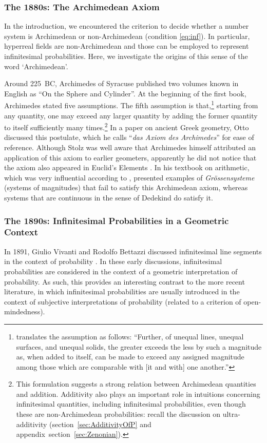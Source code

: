 \subsubsection*{The 1880s: The Archimedean Axiom}
In the introduction, we encountered the criterion to decide whether a number system is Archimedean or non-Archimedean (condition \ref{eq:inf}).
In particular, hyperreal fields are non-Archimedean and those can be employed to represent infinitesimal probabilities.
Here, we investigate the origins of this sense of the word `Archimedean'.

Around 225~BC, Archimedes of Syracuse published two volumes known in English as ``On the Sphere and Cylinder''. At the beginning of the first book, Archimedes stated five assumptions. The fifth assumption is that,\footnote{\citet[p.~4]{Heath:1897} translates the assumption as follows: ``Further, of unequal lines, unequal surfaces, and unequal solids, the greater exceeds the less by such a magnitude as, when added to itself, can be made to exceed any assigned magnitude among those which are comparable with [it and with] one another.''} starting from any quantity, one may exceed any larger quantity by adding the former quantity to itself sufficiently many times.\footnote{This formulation suggests a strong relation between Archimedean quantities and addition. Additivity also plays an important role in intuitions concerning infinitesimal quantities, including infinitesimal probabilities, even though these are non-Archimedean probabilities: recall the discussion on ultra-additivity (section~\ref{sec:AdditivityOfP} and appendix~section~\ref{sec:Zenonian}).}
In a paper on ancient Greek geometry, Otto \citet{Stolz:1883} discussed this postulate, which he calls ``\textit{das Axiom des Archimedes}'' for ease of reference. Although Stolz was well aware that Archimedes himself attributed an application of this axiom to earlier geometers, apparently he did not notice that the axiom also appeared in Euclid's Elements \citep[p.~888]{Bair-etal:2013}.
In his textbook on arithmetic, which was very influential according to \citet[p.~5]{Ehrlich:2006}, \citet{Stolz:1885} presented examples of \textit{Gr{\"o}ssensysteme} (systems of magnitudes) that fail to satisfy this Archimedean axiom, whereas systems that are continuous in the sense of Dedekind do satisfy it.

\subsubsection*{The 1890s: Infinitesimal Probabilities in a Geometric Context}
In 1891, Giulio Vivanti and Rodolfo Bettazzi discussed infinitesimal line segments in the context of probability \citep[see][]{Ehrlich:2006}.
In these early discussions, infinitesimal probabilities are considered in the context of a geometric interpretation of probability. As such, this provides an interesting contrast to the more recent literature, in which infinitesimal probabilities are usually introduced in the context of subjective interpretations of probability (related to a criterion of open-mindedness).

